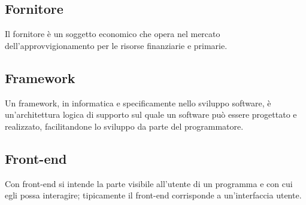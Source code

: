 
\subsection*{Fornitore}
Il fornitore è un soggetto economico che opera nel mercato dell'approvvigionamento per le risorse finanziarie e primarie.

\subsection*{Framework}
Un framework, in informatica e specificamente nello sviluppo software, è un'architettura logica di supporto sul quale un software può essere progettato e realizzato, facilitandone lo sviluppo da parte del programmatore.

\subsection*{Front-end}
Con front-end si intende la parte visibile all'utente di un programma e con cui egli possa interagire; tipicamente il front-end corrisponde a un'interfaccia utente.


